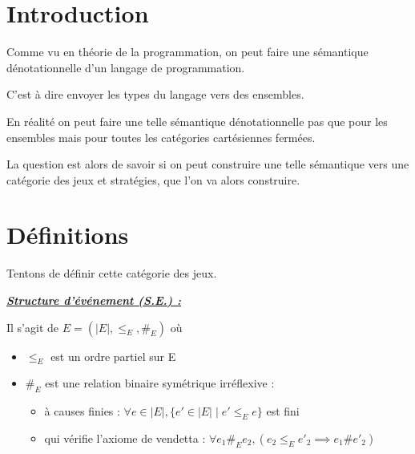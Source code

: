 \documentclass[a4paper,12ptCOUCOU
]{article}
\title{\letitle}
\author{\leauthor}
\date{}
\newlength{\mydepth}
\newlength{\myheight}
\newenvironment{answer}
{\par\begin{lrbox}{\mybox}\quad\begin{minipage}{\linewidth}\color{black}\setlength{\parskip}{10pt plus 1pt minus 1pt}\vspace*{-.7\baselineskip}}
{\end{minipage}\end{lrbox}
\settodepth{\mydepth}{\usebox{\mybox}}
\settoheight{\myheight}{\usebox{\mybox}}
\addtolength{\myheight}{\mydepth}
\noindent\makebox[0pt]{
  \color{gray}\hspace{-0pt}\rule[-\mydepth]{1pt}{\myheight}}
\usebox{\mybox}
  }
\begin{document}
\maketitle

\newpage

\section{Introduction}

Comme vu en théorie de la programmation, on peut faire une sémantique
dénotationnelle d'un langage de programmation.

C'est à dire envoyer les types du langage vers des ensembles.

En réalité on peut faire une telle sémantique dénotationnelle pas que pour les
ensembles mais pour toutes les catégories cartésiennes fermées.

La question est alors de savoir si on peut construire une telle sémantique vers
une catégorie des jeux et stratégies, que l'on va alors construire.

\section{Définitions}

Tentons de définir cette catégorie des jeux.

\begin{samepage}\textbf{\textit{\underline{ Structure d'événement (S.E.) : }}} \begin{answer}

Il s'agit de $E = (|E|, \leq_E, \#_E)$ où
\begin{itemize}
\item $\leq_E$ est un ordre partiel sur E
\item $\#_E$ est une relation binaire symétrique irréflexive :
\begin{itemize}
\item à causes finies :
$\forall e \in |E|, \{e' \in |E| \mid e' \leq_E e\}$ est fini

\item qui vérifie l'axiome de vendetta :
$\forall e_1 \#_E e_2, (e_2 \leq_E e'_2 \implies e_1 \# e'_2)$
\end{itemize}
\end{itemize}
\end{answer}\end{samepage}
\end{document}
